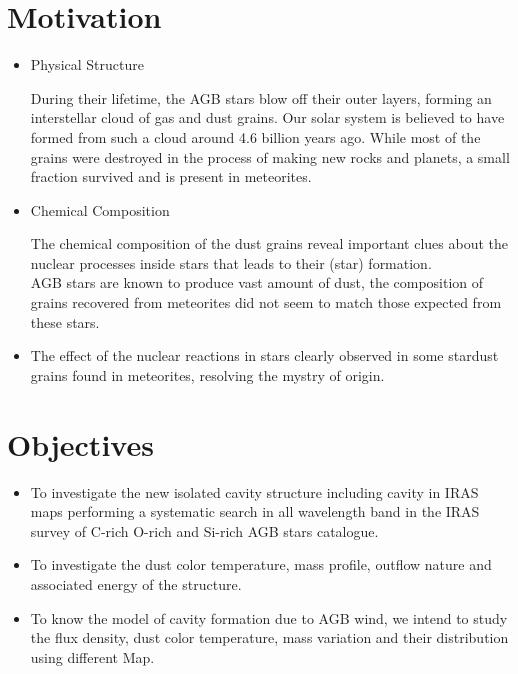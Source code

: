 \documentclass[12pt,a4paper]{report}
\begin{document}
\section{ Motivation}
\renewcommand{\labelitemi}{$\circ$}
\begin{itemize}
	
	\item	Physical Structure
	
	During their lifetime, the AGB stars blow off their outer layers, forming an interstellar cloud of gas and dust grains. Our solar system is believed to have formed from such a cloud around 4.6 billion years ago. While most of the grains were destroyed in the process of making new rocks and planets, a small fraction survived and is present in meteorites.
	
	\item Chemical Composition
	
	The chemical composition of the dust grains reveal important clues about the nuclear processes inside stars that leads to their (star) formation.
	\\AGB stars are known to produce vast amount of dust, the composition of grains recovered from meteorites did not seem to match those expected from these stars.
	
	\item The effect of the nuclear reactions in stars clearly observed in some stardust grains found in meteorites, resolving the mystry of origin.
	
\end{itemize}
\section{Objectives}
\renewcommand{\labelitemi}{$\circ$}
\begin{itemize}
	
	\item
	
	To investigate the new isolated cavity structure including cavity in	IRAS maps performing a systematic search in all wavelength band in
	the IRAS survey of C-rich O-rich and Si-rich AGB stars catalogue.
	
	\item
	
	To investigate the dust color temperature, mass profile, outflow nature
	and associated energy of the structure.
	
	\item
	
	To know the model of cavity formation due to AGB wind, we intend to
	study the flux density, dust color temperature, mass variation and their
	distribution using different Map.
\end{itemize}
\end{document}
